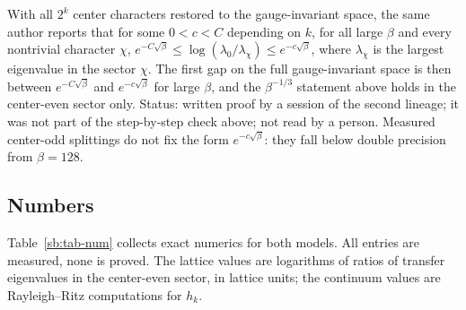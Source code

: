 \begin{remark}\label{sb:rem-center}
With all $2^k$ center characters restored to the gauge-invariant space, the same author reports that for
some $0<c<C$ depending on $k$, for all large $\beta$ and every nontrivial character $\chi$,
$e^{-C\sqrt\beta}\le\log(\lambda_0/\lambda_\chi)\le e^{-c\sqrt\beta}$, where $\lambda_\chi$ is the largest
eigenvalue in the sector $\chi$. The first gap on the full gauge-invariant space is then between
$e^{-C\sqrt\beta}$ and $e^{-c\sqrt\beta}$ for large $\beta$, and the $\beta^{-1/3}$ statement above holds in
the center-even sector only. Status: written proof by a session of the second lineage; it was not part of
the step-by-step check above; not read by a person. Measured center-odd splittings do not fix the form
$e^{-c\sqrt\beta}$: they fall below double precision from $\beta=128$.
\end{remark}

\subsection{Numbers}
Table~\ref{sb:tab-num} collects exact numerics for both models. All entries are measured, none is proved.
The lattice values are logarithms of ratios of transfer eigenvalues in the center-even sector, in lattice
units; the continuum values are Rayleigh--Ritz computations for $h_k$.

